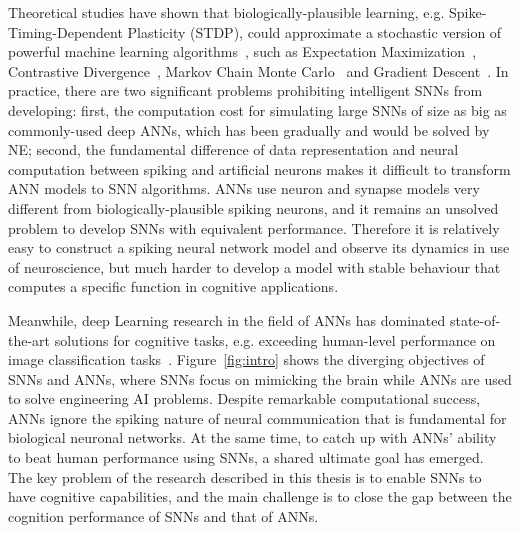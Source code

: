 Theoretical studies have shown that biologically-plausible learning, e.g. Spike-Timing-Dependent Plasticity (STDP), could approximate a stochastic version of powerful machine learning algorithms~\citep{nessler2013bayesian,neftci2013event,o2016deep}, such as Expectation Maximization~\citep{nessler2013bayesian}, Contrastive Divergence~\citep{neftci2013event}, Markov Chain Monte Carlo~\citep{buesing2011neural} and Gradient Descent~\citep{o2016deep}.
In practice, there are two significant problems prohibiting intelligent SNNs from developing: first, the computation cost for simulating large SNNs of size as big as commonly-used deep ANNs, which has been gradually and would be solved by NE;
second, the fundamental difference of data representation and neural computation between spiking and artificial neurons makes it difficult to transform ANN models to SNN algorithms.
ANNs use neuron and synapse models very different from biologically-plausible spiking neurons, and it remains an unsolved problem to develop SNNs with equivalent performance.
Therefore it is relatively easy to construct a spiking neural network model and observe its dynamics in use of neuroscience, but much harder to develop a model with stable behaviour that computes a specific function in cognitive applications.

Meanwhile, deep Learning research in the field of ANNs has dominated state-of-the-art solutions for cognitive tasks, e.g. exceeding human-level performance on image classification tasks~\citep{he2015delving}.
Figure~\ref{fig:intro} shows the diverging objectives of SNNs and ANNs, where SNNs focus on mimicking the brain while ANNs are used to solve engineering AI problems.
Despite remarkable computational success, ANNs ignore the spiking nature of neural communication that is fundamental for biological neuronal networks.
At the same time, to catch up with ANNs' ability to beat human performance using SNNs, a shared ultimate goal has emerged.
The key problem of the research described in this thesis is to enable SNNs to have cognitive capabilities, and the main challenge is to close the gap between the cognition performance of SNNs and that of ANNs.

